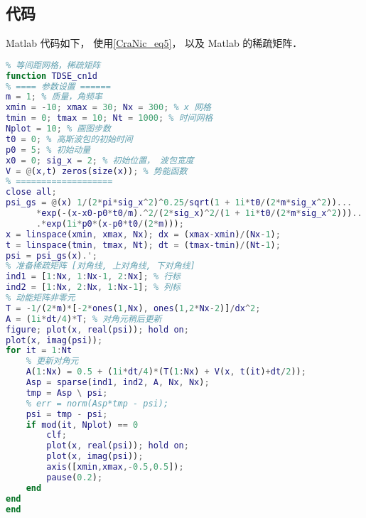 \subsection{代码}
Matlab 代码如下， 使用\autoref{CraNic_eq5}， 以及 Matlab 的稀疏矩阵．

\begin{lstlisting}[language=matlab, caption=TDSE\_cn1d.m]
% Crank-Nicolson 法解一维薛定谔方程
% 等间距网格，稀疏矩阵
function TDSE_cn1d
% ==== 参数设置 ======
m = 1; % 质量，角频率
xmin = -10; xmax = 30; Nx = 300; % x 网格
tmin = 0; tmax = 10; Nt = 1000; % 时间网格
Nplot = 10; % 画图步数
t0 = 0; % 高斯波包的初始时间
p0 = 5; % 初始动量
x0 = 0; sig_x = 2; % 初始位置， 波包宽度
V = @(x,t) zeros(size(x)); % 势能函数
% ===================
close all;
psi_gs = @(x) 1/(2*pi*sig_x^2)^0.25/sqrt(1 + 1i*t0/(2*m*sig_x^2))...
      *exp(-(x-x0-p0*t0/m).^2/(2*sig_x)^2/(1 + 1i*t0/(2*m*sig_x^2)))...
      .*exp(1i*p0*(x-p0*t0/(2*m)));
x = linspace(xmin, xmax, Nx); dx = (xmax-xmin)/(Nx-1);
t = linspace(tmin, tmax, Nt); dt = (tmax-tmin)/(Nt-1);
psi = psi_gs(x).';
% 准备稀疏矩阵 [对角线, 上对角线, 下对角线]
ind1 = [1:Nx, 1:Nx-1, 2:Nx]; % 行标
ind2 = [1:Nx, 2:Nx, 1:Nx-1]; % 列标
% 动能矩阵非零元
T = -1/(2*m)*[-2*ones(1,Nx), ones(1,2*Nx-2)]/dx^2;
A = (1i*dt/4)*T; % 对角元稍后更新
figure; plot(x, real(psi)); hold on;
plot(x, imag(psi));
for it = 1:Nt
    % 更新对角元
    A(1:Nx) = 0.5 + (1i*dt/4)*(T(1:Nx) + V(x, t(it)+dt/2));
    Asp = sparse(ind1, ind2, A, Nx, Nx);
    tmp = Asp \ psi;
    % err = norm(Asp*tmp - psi);
    psi = tmp - psi;
    if mod(it, Nplot) == 0
        clf;
        plot(x, real(psi)); hold on;
        plot(x, imag(psi));
        axis([xmin,xmax,-0.5,0.5]);
        pause(0.2);
    end
end
end
\end{lstlisting}
